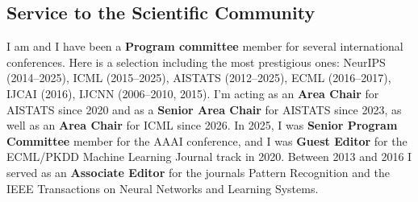 \documentclass[oneside, a4paper, onecolumn, 10pt]{article}
\begin{document}



\subsection*{Service to the Scientific Community}

I am and I have been a {\bf Program committee} member for several international conferences. 
Here is a selection including the most prestigious ones:
  NeurIPS (2014--2025),
  ICML (2015--2025),
  AISTATS (2012--2025), 
  ECML (2016--2017),
  IJCAI (2016),
  IJCNN (2006--2010, 2015).
  I'm acting as an {\bf Area Chair} for AISTATS since 2020 and as a {\bf Senior Area Chair} for AISTATS since 2023, as well as an {\bf Area Chair} for ICML since 2026.
  In 2025, I was {\bf Senior Program Committee} member for the AAAI conference, and I was {\bf Guest Editor} for the ECML/PKDD Machine Learning Journal track in 2020.
Between 2013 and 2016 I served as an {\bf Associate Editor} for the journals Pattern Recognition and the IEEE Transactions on Neural Networks and Learning Systems.


\end{document}
